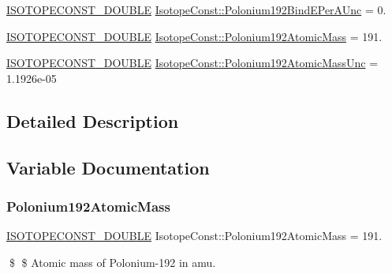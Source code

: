 \begin{DoxyCompactItemize}
\mbox{\hyperlink{group___isotope_const-_macros_ga8f45a7272ce02c0b4c65c44636ed719a}{I\+S\+O\+T\+O\+P\+E\+C\+O\+N\+S\+T\+\_\+\+D\+O\+U\+B\+LE}} \mbox{\hyperlink{group___isotope_const-_polonium-_po192_ga01cf7311f0a685ef3091928261f19a4e}{Isotope\+Const\+::\+Polonium192\+Bind\+E\+Per\+A\+Unc}} = 0.
\item 
\mbox{\hyperlink{group___isotope_const-_macros_ga8f45a7272ce02c0b4c65c44636ed719a}{I\+S\+O\+T\+O\+P\+E\+C\+O\+N\+S\+T\+\_\+\+D\+O\+U\+B\+LE}} \mbox{\hyperlink{group___isotope_const-_polonium-_po192_ga5e9b4cd57f8065b1faacae5fbb21058e}{Isotope\+Const\+::\+Polonium192\+Atomic\+Mass}} = 191.
\item 
\mbox{\hyperlink{group___isotope_const-_macros_ga8f45a7272ce02c0b4c65c44636ed719a}{I\+S\+O\+T\+O\+P\+E\+C\+O\+N\+S\+T\+\_\+\+D\+O\+U\+B\+LE}} \mbox{\hyperlink{group___isotope_const-_polonium-_po192_gaa2daa3245618be2bf2d9566305778afa}{Isotope\+Const\+::\+Polonium192\+Atomic\+Mass\+Unc}} = 1.\+1926e-\/05
\end{DoxyCompactItemize}


\subsection{Detailed Description}


\subsection{Variable Documentation}
\mbox{\label{group___isotope_const-_polonium-_po192_ga5e9b4cd57f8065b1faacae5fbb21058e}} 
\subsubsection{\texorpdfstring{Polonium192\+Atomic\+Mass}{Polonium192AtomicMass}}
{\footnotesize\ttfamily \mbox{\hyperlink{group___isotope_const-_macros_ga8f45a7272ce02c0b4c65c44636ed719a}{I\+S\+O\+T\+O\+P\+E\+C\+O\+N\+S\+T\+\_\+\+D\+O\+U\+B\+LE}} Isotope\+Const\+::\+Polonium192\+Atomic\+Mass = 191.}

\$ \$ Atomic mass of Polonium-\/192 in amu. \mbox{\label{group___isotope_const-_polonium-_po192_gaa2daa3245618be2bf2d9566305778afa}} 
